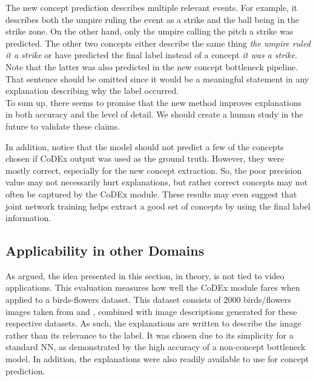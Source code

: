 The new concept prediction describes multiple relevant events. 
For example, it describes both the umpire ruling the event as a strike and the ball being in the strike zone.
On the other hand, only the umpire calling the pitch a strike was predicted. 
The other two concepts either describe the same thing \emph{the umpire ruled it a strike} or have predicted the final label instead of a concept \emph{it was a strike}.
Note that the latter was also predicted in the new concept bottleneck pipeline. 
That sentence should be omitted since it would be a meaningful statement in any explanation describing why the label occurred. \\

To sum up, there seems to promise that the new method improves explanations in both accuracy and the level of detail.
We should create a human study in the future to validate these claims.

In addition, notice that the model should not predict a few of the concepts chosen if CoDEx output was used as the ground truth.
However, they were mostly correct, especially for the new concept extraction.
So, the poor precision value may not necessarily hurt explanations, but rather correct concepts may not often be captured by the CoDEx module.
These results may even suggest that joint network training helps extract a good set of concepts by using the final label information. 


\subsection{Applicability in other Domains}
\label{applicability-in-other-domains}


As argued, the idea presented in this section, in theory, is not tied to video applications.
This evaluation measures how well the CoDEx module fares when applied to a birds-flowers dataset.
This dataset consists of 2000 birds/flowers images taken from \cite{RefWorks:RefID:87-wah2011caltech-ucsd} and \cite{RefWorks:RefID:70-nilsback2008automated}, combined with image descriptions generated for these respective datasets.
As such, the explanations are written to describe the image rather than its relevance to the label.
It was chosen due to its simplicity for a standard NN, as demonstrated by the high accuracy of a non-concept bottleneck model. 
In addition, the explanations were also readily available to use for concept prediction.

